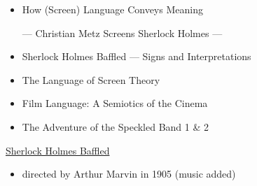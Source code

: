 \documentclass[a4paper,landscape,headrule,footrule,xetex]{foils}
\begin{document}
\makexeCJKinactive
\renewcommand{\avmvalfont}{\it}
\maketitle


\begin{itemize}
\item How (Screen) Language
  Conveys Meaning
  \begin{center}
  — Christian Metz Screens Sherlock Holmes  —
      \end{center}
\item 
Sherlock Holmes Baffled — Signs and
Interpretations
\item 
The Language of Screen Theory
\item Film Language: A Semiotics of the Cinema
\item The Adventure of the Speckled Band 1 \& 2
\end{itemize}

\href{https://www.youtube.com/watch?v=HYN4QzX9-EM}{Sherlock Holmes Baffled}

\begin{itemize} 
\item directed by Arthur Marvin in 1905 (music added)
\end{itemize}

\end{document}
